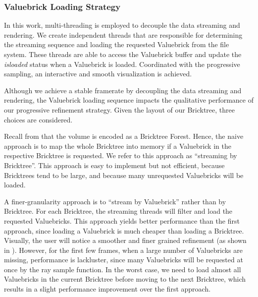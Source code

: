 \subsubsection{Valuebrick Loading Strategy}
In this work, multi-threading is employed to decouple the data streaming and rendering. 
We create independent threads that are responsible for determining the streaming sequence
and loading the requested Valuebrick from the file system. These threads are able to access
the Valuebrick buffer and update the \textit{isloaded} status when a Valuebrick is loaded. 
Coordinated with the progressive sampling, an interactive and smooth visualization is achieved.

Although we achieve a stable framerate by decoupling the data streaming and rendering, the 
Valuebrick loading sequence impacts the qualitative performance of our 
progressive refinement strategy. Given the layout of our Bricktree, three choices are considered.

Recall from  that the volume is encoded as a Bricktree Forest. 
Hence, the naive approach is to map the whole Bricktree into memory if a Valuebrick in the
respective Bricktree is requested. We refer to this approach as ``streaming by Bricktree''. 
This approach is easy to implement but not efficient, because Bricktrees tend to be large, 
and because many unrequested Valuebricks will be loaded. 



A finer-granularity approach is to ``stream by Valuebrick'' rather than by Bricktree. For each
Bricktree, the streaming threads will filter and load the requested Valuebricks. 
This approach yields better performance than the first approach, since loading a Valuebrick
is much cheaper than loading a Bricktree. Visually, the user will notice a smoother and finer grained refinement (as shown in ).
However, for the first few frames, when a large number of Valuebricks are missing, performance is lackluster, since many Valuebricks will be requested at once by the ray sample function.
In the worst case, we need to load almost all Valuebricks
in the current Bricktree before moving to the next Bricktree, which results in a slight performance improvement over the first approach.



